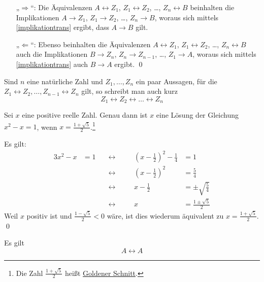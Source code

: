 \begin{bew}[*]
    \begin{enumerate}
        \item[„$\Rightarrow$“:] Die Äquivalenzen $A\leftrightarrow Z_1$, $Z_1\leftrightarrow Z_2$, \dots, $Z_n\leftrightarrow B$ beinhalten die Implikationen $A\to Z_1$, $Z_1\to Z_2$, \dots, $Z_n\to B$, woraus sich mittels \cref{implikationtrans} ergibt, dass $A\to B$ gilt.
        \item[„$\Leftarrow$“:] Ebenso beinhalten die Äquivalenzen $A\leftrightarrow Z_1$, $Z_1\leftrightarrow Z_2$, \dots, $Z_n\leftrightarrow B$ auch die Implikationen $B\to Z_n$, $Z_n\to Z_{n-1}$, \dots, $Z_1\to A$, woraus sich mittels \cref{implikationtrans} auch $B\to A$ ergibt. \qed
    \end{enumerate}
\end{bew}


\begin{nota}
    Sind $n$ eine natürliche Zahl und $Z_1,\dots , Z_n$ ein paar Aussagen, für die $Z_1\leftrightarrow Z_2,\dots, Z_{n-1}\leftrightarrow Z_n$ gilt, so schreibt man auch kurz
    \[ Z_1\leftrightarrow Z_2 \leftrightarrow \ldots \leftrightarrow  Z_n\]
\end{nota}


\begin{bsp}
    Sei $x$ eine positive reelle Zahl. Genau dann ist $x$ eine Lösung der Gleichung $x^2-x=1$, wenn $x= \frac{1+\sqrt{5}}{2}$.\footnote{Die Zahl $\frac{1+\sqrt{5}}{2}$ heißt \href{https://de.wikipedia.org/wiki/Goldener_Schnitt}{Goldener Schnitt}.}
\end{bsp}


\begin{bew}
    Es gilt:
    \begin{alignat*}{3}
        x^2-x& =1 \quad&\leftrightarrow\quad&& \left(x-\frac{1}{2}\right)^2 - \frac{1}{4} &= 1 \\
        && \leftrightarrow\quad&& \left(x-\frac{1}{2}\right)^2&=\frac{5}{4} \\
        && \leftrightarrow\quad&& x-\frac{1}{2} &= \pm \sqrt{\frac{5}{4}} \\
        && \leftrightarrow\quad&& x  &= \frac{1\pm \sqrt{5}}{2} 
    \end{alignat*}
    Weil $x$ positiv ist und $\frac{1-\sqrt{5}}{2}<0$ wäre, ist dies wiederum äquivalent zu $x=\frac{1+\sqrt{5}}{2}$. \qed
\end{bew}


\begin{satz}\label{iffref}
    Es gilt
        \[ A\leftrightarrow A \]
\end{satz}


